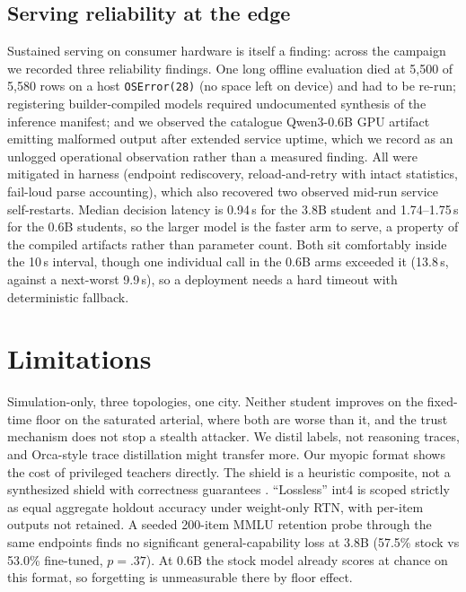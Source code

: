 \documentclass[conference]{IEEEtran}
\begin{document}
\subsection{Serving reliability at the edge}
Sustained serving on consumer hardware is itself a finding: across the
campaign we recorded three reliability findings. One long offline
evaluation died at 5{,}500 of 5{,}580 rows on a host \texttt{OSError(28)}
(no space left on device) and had to be re-run; registering
builder-compiled models required undocumented synthesis of the inference
manifest; and we observed the catalogue Qwen3-0.6B GPU artifact emitting
malformed output after extended service uptime, which we record as an
unlogged operational observation rather than a measured finding. All were
mitigated in harness (endpoint
rediscovery, reload-and-retry with intact statistics, fail-loud parse
accounting), which also recovered two observed mid-run service
self-restarts. Median decision latency is 0.94\,s for the 3.8B student and
1.74--1.75\,s for the 0.6B students, so the larger model is the faster arm
to serve, a property of the compiled artifacts rather than parameter
count. Both sit comfortably inside the 10\,s interval, though one
individual call in the 0.6B arms exceeded it (13.8\,s, against a next-worst
9.9\,s), so a deployment needs a hard timeout with deterministic
fallback.

\section{Limitations}\label{sec:limits}
Simulation-only, three topologies, one city. Neither student improves on
the fixed-time floor on the saturated arterial, where both are worse than
it, and the trust mechanism does not stop a stealth attacker. We distil
labels, not reasoning traces, and Orca-style trace distillation
\cite{mukherjee2023orca} might transfer more. Our myopic format shows the
cost of privileged teachers directly. The shield is a heuristic composite,
not a synthesized shield with
correctness guarantees \cite{alshiekh2018shield}. ``Lossless'' int4 is scoped
strictly as equal aggregate holdout accuracy under weight-only RTN, with
per-item outputs not retained. A seeded
200-item MMLU retention probe through the same endpoints finds no
significant general-capability loss at 3.8B (57.5\% stock vs 53.0\%
fine-tuned, $p{=}.37$). At 0.6B the stock model already scores at chance
on this format, so forgetting is unmeasurable there by floor effect.
\end{document}

